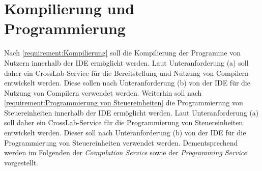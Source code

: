 \section{Kompilierung und Programmierung}\label{section:konzeption:kompilierung-und-programmierung}


Nach \autoref{requirement:Kompilierung} soll die Kompilierung der Programme von Nutzern innerhalb der IDE ermöglicht werden. Laut Unteranforderung (a) soll daher ein CrossLab-Service für die Bereitstellung und Nutzung von Compilern entwickelt werden. Diese sollen nach Unteranforderung (b) von der IDE für die Nutzung von Compilern verwendet werden. Weiterhin soll nach \autoref{requirement:Programmierung von Steuereinheiten} die Programmierung von Steuereinheiten innerhalb der IDE ermöglicht werden. Laut Unteranforderung (a) soll daher ein CrossLab-Service für die Programmierung von Steuereinheiten entwickelt werden. Dieser soll nach Unteranforderung (b) von der IDE für die Programmierung von Steuereinheiten verwendet werden. Dementsprechend werden im Folgenden der \textit{Compilation Service} sowie der \textit{Programming Service} vorgestellt.

